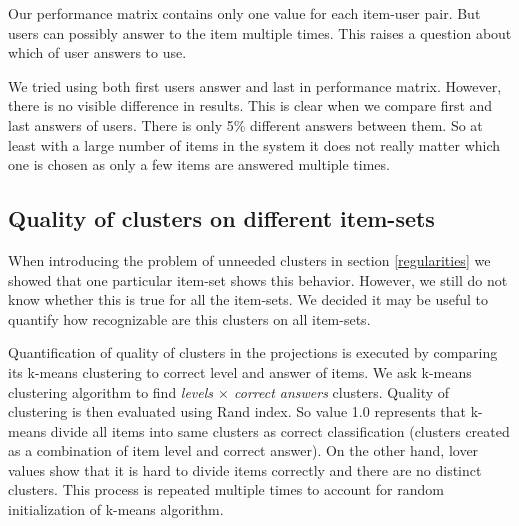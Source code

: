 \documentclass[
  digital, %
  table,   %
  nolof,     %
  nolot,     %
  nocover,
  color,
  final, %
]{fithesis3}
\begin{document}
Our performance matrix contains only one value for each item-user pair. But users can possibly answer to the item multiple times. This raises a question about which of user answers to use.


We tried using both first users answer and last in performance matrix. However, there is no visible difference in results. This is clear when we compare first and last answers of users. There is only 5\% different answers between them. So at least with a large number of items in the system it does not really matter which one is chosen as only a few items are answered multiple times.


\subsection{Quality of clusters on different item-sets}\label{quality-of-clusters}

When introducing the problem of unneeded clusters in section \ref{regularities} we showed that one particular item-set shows this behavior. However, we still do not know whether this is true for all the item-sets. We decided it may be useful to quantify how recognizable are this clusters on all item-sets.


Quantification of quality of clusters in the projections is executed by comparing its k-means clustering to correct level and answer of items. We ask k-means clustering algorithm to find \textit{levels $\times$ correct answers} clusters. Quality of clustering is then evaluated using Rand index. So value 1.0 represents that k-means divide all items into same clusters as correct classification (clusters created as a combination of item level and correct answer). On the other hand, lover values show that it is hard to divide items correctly and there are no distinct clusters. This process is repeated multiple times to account for random initialization of k-means algorithm.
\end{document}
